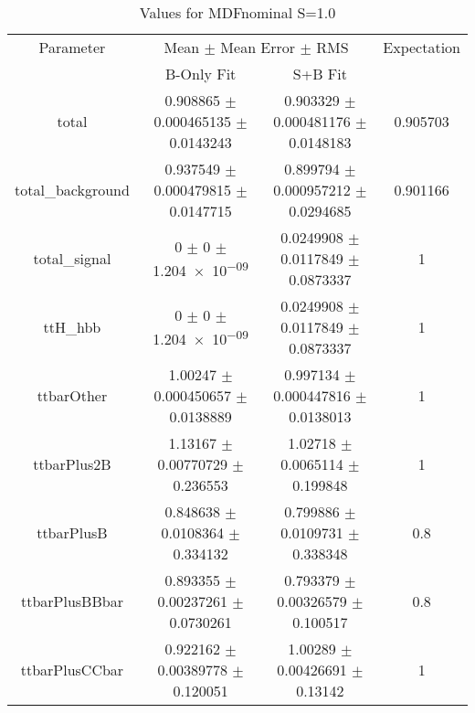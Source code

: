 \begin{table}
\centering
\caption{Values for MDFnominal S=1.0}
\begin{tabular}{cccc}
\toprule
Parameter & \multicolumn{2}{c}{Mean $\pm$ Mean Error $\pm$ RMS} & Expectation\\
 & B-Only Fit & S+B Fit & \\
\midrule
total & \num{0.908865} $\pm$ \num{0.000465135} $\pm$ \num{0.0143243} & \num{0.903329} $\pm$ \num{0.000481176} $\pm$ \num{0.0148183} & \num{0.905703}\\
total\_background & \num{0.937549} $\pm$ \num{0.000479815} $\pm$ \num{0.0147715} & \num{0.899794} $\pm$ \num{0.000957212} $\pm$ \num{0.0294685} & \num{0.901166}\\
total\_signal & \num{0} $\pm$ \num{0} $\pm$ \num{1.204e-09} & \num{0.0249908} $\pm$ \num{0.0117849} $\pm$ \num{0.0873337} & \num{1}\\
ttH\_hbb & \num{0} $\pm$ \num{0} $\pm$ \num{1.204e-09} & \num{0.0249908} $\pm$ \num{0.0117849} $\pm$ \num{0.0873337} & \num{1}\\
ttbarOther & \num{1.00247} $\pm$ \num{0.000450657} $\pm$ \num{0.0138889} & \num{0.997134} $\pm$ \num{0.000447816} $\pm$ \num{0.0138013} & \num{1}\\
ttbarPlus2B & \num{1.13167} $\pm$ \num{0.00770729} $\pm$ \num{0.236553} & \num{1.02718} $\pm$ \num{0.0065114} $\pm$ \num{0.199848} & \num{1}\\
ttbarPlusB & \num{0.848638} $\pm$ \num{0.0108364} $\pm$ \num{0.334132} & \num{0.799886} $\pm$ \num{0.0109731} $\pm$ \num{0.338348} & \num{0.8}\\
ttbarPlusBBbar & \num{0.893355} $\pm$ \num{0.00237261} $\pm$ \num{0.0730261} & \num{0.793379} $\pm$ \num{0.00326579} $\pm$ \num{0.100517} & \num{0.8}\\
ttbarPlusCCbar & \num{0.922162} $\pm$ \num{0.00389778} $\pm$ \num{0.120051} & \num{1.00289} $\pm$ \num{0.00426691} $\pm$ \num{0.13142} & \num{1}\\
\bottomrule
\end{tabular}
\end{table}